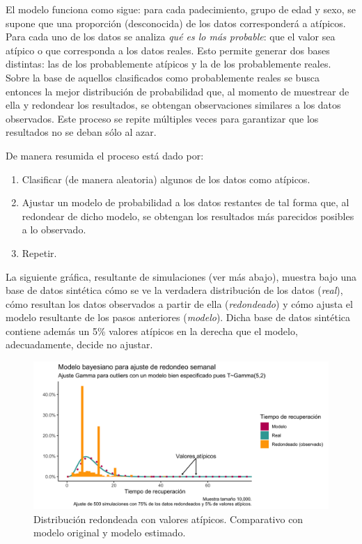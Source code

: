 \documentclass[
]{article}
\begin{document}
El modelo funciona como sigue: para cada padecimiento, grupo de edad y
sexo, se supone que una proporción (desconocida) de los datos
corresponderá a atípicos. Para cada uno de los datos se analiza
\emph{qué es lo más probable}: que el valor sea atípico o que
corresponda a los datos reales. Esto permite generar dos bases
distintas: las de los probablemente atípicos y la de los probablemente
reales. Sobre la base de aquellos clasificados como probablemente reales
se busca entonces la mejor distribución de probabilidad que, al momento
de muestrear de ella y redondear los resultados, se obtengan
observaciones similares a los datos observados. Este proceso se repite
múltiples veces para garantizar que los resultados no se deban sólo al
azar.

De manera resumida el proceso está dado por:

\begin{enumerate}
\def\labelenumi{\arabic{enumi}.}
\item
  Clasificar (de manera aleatoria) algunos de los datos como atípicos.
\item
  Ajustar un modelo de probabilidad a los datos restantes de tal forma
  que, al redondear de dicho modelo, se obtengan los resultados más
  parecidos posibles a lo observado.
\item
  Repetir.
\end{enumerate}

La siguiente gráfica, resultante de simulaciones (ver más abajo),
muestra bajo una base de datos sintética cómo se ve la verdadera
distribución de los datos (\emph{real}), cómo resultan los datos
observados a partir de ella (\emph{redondeado}) y cómo ajusta el modelo
resultante de los pasos anteriores (\emph{modelo}). Dicha base de datos
sintética contiene además un 5\% valores atípicos en la derecha que el
modelo, adecuadamente, decide no ajustar.

\begin{figure}
\centering
\includegraphics{images/Atipicosgamma.png}
\caption{Distribución redondeada con valores atípicos. Comparativo con
modelo original y modelo estimado.}
\end{figure}
\end{document}
